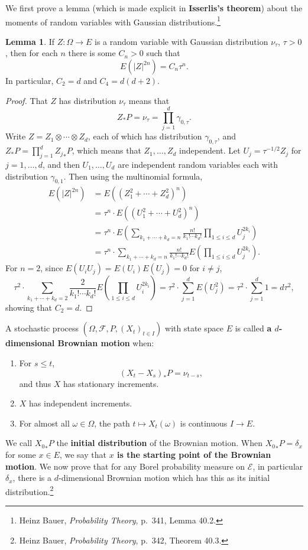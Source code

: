 \documentclass{article}
\theoremstyle{definition}
\newtheorem{lemma}[theorem]{Lemma}
\theoremstyle{definition}
\begin{document}
We first prove a lemma (which is made explicit in \textbf{Isserlis's theorem}) about the moments of random variables with Gaussian distributions.\footnote{Heinz Bauer,
{\em Probability Theory}, p.~341, Lemma 40.2.}

\begin{lemma}
If $Z:\Omega \to E$ is a random variable with Gaussian distribution $\nu_\tau$, $\tau>0$, then for each $n$ there is some
$C_n>0$ such that 
\[
E(|Z|^{2n})=C_n \tau^n.
\]
In particular, $C_2=d$ and $C_4=d(d+2)$. 
\label{isserlis}
\end{lemma}
\begin{proof}
That $Z$ has distribution $\nu_\tau$ means that
\[
Z_*P = \nu_\tau = \prod_{j=1}^d \gamma_{0,\tau}.
\]
Write $Z=Z_1 \otimes \cdots \otimes Z_d$, each of which has 
distribution $\gamma_{0,\tau}$, and
$Z_*P=\prod_{j=1}^d {Z_j}_*P$, which means that $Z_1,\ldots,Z_d$
 independent.
Let $U_j=\tau^{-1/2} Z_j$ for $j=1,\ldots,d$, and then $U_1,\ldots,U_d$ are independent random variables
each with distribution $\gamma_{0,1}$. Then using the multinomial formula,
\begin{align*}
E(|Z|^{2n})&=E((Z_1^2+\cdots+Z_d^2)^n)\\
&= \tau^n \cdot E((U_1^2+\cdots+U_d^2)^n)\\
&=\tau^n\cdot E\left( \sum_{k_1+\cdots+k_d=n} \frac{n!}{k_1! \cdots k_d!} \prod_{1 \leq i \leq d} U_j^{2k_i} \right)\\
&=\tau^n \cdot \sum_{k_1+\cdots+k_d=n} \frac{n!}{k_1! \cdots k_d!} E\left(\prod_{1 \leq i \leq d} U_j^{2k_i} \right).
\end{align*}
For $n=2$, since $E(U_i U_j)=E(U_i)E(U_j)=0$ for $i \neq j$,
\[
\tau^2\cdot \sum_{k_1+\cdots+k_d=2} \frac{2}{k_1! \cdots k_d!} E\left(\prod_{1 \leq i \leq d} U_i^{2k_i} \right)
=\tau^2 \cdot \sum_{j=1}^d E(U_j^2)=\tau^2 \cdot \sum_{j=1}^d 1 = d\tau^2,
\]
showing that $C_2=d$. 
\end{proof}


A stochastic process 
$(\Omega,\mathscr{F},P,(X_t)_{t \in I})$
with state space $E$ is called \textbf{a $d$-dimensional Brownian motion} when:
\begin{enumerate}
\item For $s \leq t$,
\[
(X_t-X_s)_*P = \nu_{t-s},
\]
and thus $X$ has stationary increments.
\item $X$ has independent increments.
\item For almost all $\omega \in \Omega$, the path $t \mapsto X_t(\omega)$ is continuous
$I \to E$. 
\end{enumerate}
We call ${X_0}_*P$ the \textbf{initial distribution} of the Brownian motion. When
${X_0}_*P=\delta_x$ for some $x \in E$, we say that \textbf{$x$ is the starting point of the Brownian motion}.
We now prove that for any Borel probability measure on $\mathscr{E}$, in particular $\delta_x$, there is a
$d$-dimensional Brownian
motion which has this as its initial distribution.\footnote{Heinz Bauer, {\em Probability Theory},
p.~342, Theorem 40.3.}
\end{document}

